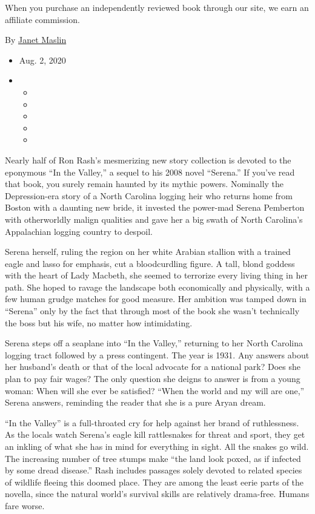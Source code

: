 When you purchase an independently reviewed book through our site, we
earn an affiliate commission.

By \href{https://www.nytimes.com/by/janet-maslin}{Janet Maslin}

\begin{itemize}
\item
  Aug. 2, 2020
\item
  \begin{itemize}
  \item
  \item
  \item
  \item
  \item
  \end{itemize}
\end{itemize}

Nearly half of Ron Rash's mesmerizing new story collection is devoted to
the eponymous ``In the Valley,'' a sequel to his 2008 novel ``Serena.''
If you've read that book, you surely remain haunted by its mythic
powers. Nominally the Depression-era story of a North Carolina logging
heir who returns home from Boston with a daunting new bride, it invested
the power-mad Serena Pemberton with otherworldly malign qualities and
gave her a big swath of North Carolina's Appalachian logging country to
despoil.

Serena herself, ruling the region on her white Arabian stallion with a
trained eagle and lasso for emphasis, cut a bloodcurdling figure. A
tall, blond goddess with the heart of Lady Macbeth, she seemed to
terrorize every living thing in her path. She hoped to ravage the
landscape both economically and physically, with a few human grudge
matches for good measure. Her ambition was tamped down in ``Serena''
only by the fact that through most of the book she wasn't technically
the boss but his wife, no matter how intimidating.

Serena steps off a seaplane into ``In the Valley,'' returning to her
North Carolina logging tract followed by a press contingent. The year is
1931. Any answers about her husband's death or that of the local
advocate for a national park? Does she plan to pay fair wages? The only
question she deigns to answer is from a young woman: When will she ever
be satisfied? ``When the world and my will are one,'' Serena answers,
reminding the reader that she is a pure Aryan dream.

``In the Valley'' is a full-throated cry for help against her brand of
ruthlessness. As the locals watch Serena's eagle kill rattlesnakes for
threat and sport, they get an inkling of what she has in mind for
everything in sight. All the snakes go wild. The increasing number of
tree stumps make ``the land look poxed, as if infected by some dread
disease.'' Rash includes passages solely devoted to related species of
wildlife fleeing this doomed place. They are among the least eerie parts
of the novella, since the natural world's survival skills are relatively
drama-free. Humans fare worse.

